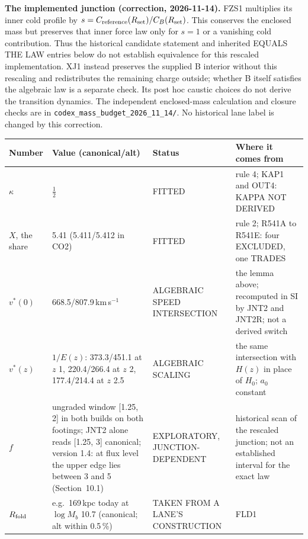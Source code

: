 \documentclass[10pt]{article}
\begin{document}
\textbf{The implemented junction (correction, 2026-11-14).} FZS1 multiplies its inner cold profile by $s=C_{\rm reference}(R_{\rm set})/C_B(R_{\rm set})$. This conserves the enclosed mass but preserves that inner force law only for $s=1$ or a vanishing cold contribution. Thus the historical candidate statement and inherited EQUALS THE LAW entries below do not establish equivalence for this rescaled implementation. XJ1 instead preserves the supplied B interior without this rescaling and redistributes the remaining charge outside; whether B itself satisfies the algebraic law is a separate check. Its post hoc caustic choices do not derive the transition dynamics. The independent enclosed-mass calculation and closure checks are in \texttt{codex\_mass\_budget\_2026\_11\_14/}. No historical lane label is changed by this correction.

{\small
\begin{longtable}{@{}p{2.0cm}p{6.0cm}>{\raggedright\arraybackslash}p{3.4cm}p{4.3cm}@{}}\toprule
Number & Value (canonical/alt) & Status & Where it comes from\\\midrule\endhead
$\kappa$ & $\tfrac12$ & FITTED & rule 4; KAP1 and OUT4: KAPPA NOT DERIVED\\
$X$, the share & 5.41 (5.411/5.412 in CO2) & FITTED & rule 2; R541A to R541E: four EXCLUDED, one TRADES\\
$v^*(0)$ & 668.5/807.9\,km\,s$^{-1}$ & ALGEBRAIC SPEED INTERSECTION & the lemma above; recomputed in SI by JNT2 and JNT2R; not a derived switch\\
$v^*(z)$ & $1/E(z)$: 373.3/451.1 at $z$ 1, 220.4/266.4 at $z$ 2, 177.4/214.4 at $z$ 2.5 & ALGEBRAIC SCALING & the same intersection with $H(z)$ in place of $H_0$; $a_0$ constant\\
$f$ & ungraded window [1.25, 2] in both builds on both footings; JNT2 alone reads [1.25, 3] canonical; version 1.4: at flux level the upper edge lies between 3 and 5 (Section~10.1) & EXPLORATORY, JUNCTION-DEPENDENT & historical scan of the rescaled junction; not an established interval for the exact law\\
$R_{\rm fold}$ & e.g.\ 169\,kpc today at $\log M_b$ 10.7 (canonical; alt within 0.5\,\%) & TAKEN FROM A LANE'S CONSTRUCTION & FLD1\\\bottomrule
\end{longtable}}
\end{document}
